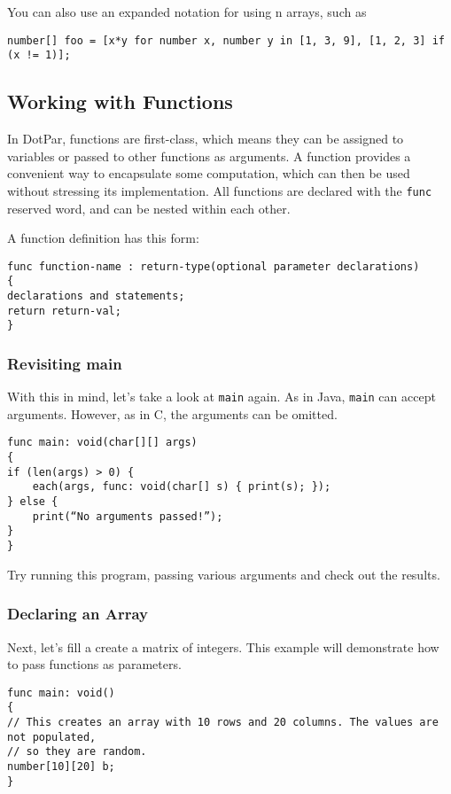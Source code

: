 \documentclass{article}
\begin{document}
You can also use an expanded notation for using n arrays, such as

\begin{verbatim}
number[] foo = [x*y for number x, number y in [1, 3, 9], [1, 2, 3] if (x != 1)];
\end{verbatim}

\subsection{Working with Functions}
In DotPar, functions are first-class, which means they can be assigned to variables or passed to other functions as arguments. A function provides a convenient way to encapsulate some computation, which can then be used without stressing its implementation. All functions are declared with the \verb!func! reserved word, and can be nested within each other.

A function definition has this form:

\begin{verbatim}
func function-name : return-type(optional parameter declarations)
{
declarations and statements;
return return-val;
}
\end{verbatim}

\subsubsection{Revisiting main}
With this in mind, let’s take a look at \verb!main! again. As in Java, \verb!main! can accept arguments. However, as in C, the arguments can be omitted.

\begin{verbatim}
func main: void(char[][] args)
{
if (len(args) > 0) {
	each(args, func: void(char[] s) { print(s); });
} else {
	print(“No arguments passed!”);
}
}
\end{verbatim}

Try running this program, passing various arguments and check out the results.

\subsubsection{Declaring an Array}
Next, let’s fill a create a matrix of integers. This example will demonstrate how to pass functions as parameters.

\begin{verbatim}
func main: void()
{
// This creates an array with 10 rows and 20 columns. The values are not populated,
// so they are random.
number[10][20] b;
}
\end{verbatim}
\end{document}
